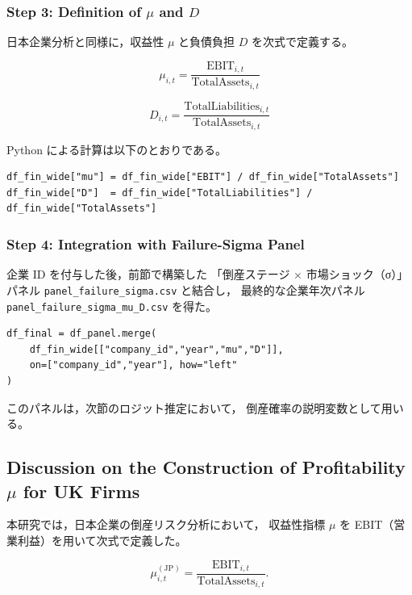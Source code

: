\subsubsection*{Step 3: Definition of $\mu$ and $D$}

日本企業分析と同様に，収益性 $\mu$ と負債負担 $D$ を次式で定義する。



\[
\mu_{i,t} = \frac{\text{EBIT}_{i,t}}{\text{TotalAssets}_{i,t}}
\]





\[
D_{i,t} = \frac{\text{TotalLiabilities}_{i,t}}{\text{TotalAssets}_{i,t}}
\]



Python による計算は以下のとおりである。

\begin{verbatim}
df_fin_wide["mu"] = df_fin_wide["EBIT"] / df_fin_wide["TotalAssets"]
df_fin_wide["D"]  = df_fin_wide["TotalLiabilities"] / df_fin_wide["TotalAssets"]
\end{verbatim}

\subsubsection*{Step 4: Integration with Failure-Sigma Panel}

企業 ID を付与した後，前節で構築した
「倒産ステージ × 市場ショック（σ）」パネル
\texttt{panel\_failure\_sigma.csv} と結合し，
最終的な企業年次パネル \texttt{panel\_failure\_sigma\_mu\_D.csv} を得た。

\begin{verbatim}
df_final = df_panel.merge(
    df_fin_wide[["company_id","year","mu","D"]],
    on=["company_id","year"], how="left"
)
\end{verbatim}

このパネルは，次節のロジット推定において，
倒産確率の説明変数として用いる。

\subsection*{Discussion on the Construction of Profitability $\mu$ for UK Firms}

本研究では，日本企業の倒産リスク分析において，
収益性指標 $\mu$ を EBIT（営業利益）を用いて次式で定義した。



\[
\mu_{i,t}^{(\text{JP})}
= \frac{\text{EBIT}_{i,t}}{\text{TotalAssets}_{i,t}}.
\]



